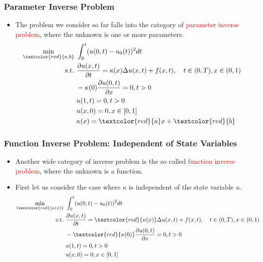 \documentclass{beamer}
\begin{document}
\begin{frame}
	\frametitle{Parameter Inverse Problem}
	\begin{itemize}
		\item The problem we consider so far falls into the category of \textcolor{red}{parameter inverse problem}, where the unknown is one or more parameters. 
		$$\begin{aligned}
\min_{\textcolor{red}{a, b}}\ & \int_{0}^t ( u(0, t)- u_0(t))^2 dt\\
\mathrm{s.t.}\ & \frac{\partial u(x, t)}{\partial t} = \kappa(x)\Delta u(x, t) + f(x, t), \quad t\in (0,T), x\in (0,1) \\
& -\kappa(0)\frac{\partial u(0,t)}{\partial x} = 0, t>0\\
& u(1, t) = 0, t>0\\
& u(x, 0) = 0, x\in [0,1]\\
& \kappa(x) = \textcolor{red}{a} x + \textcolor{red}{b}
\end{aligned}$$

	\end{itemize}
\end{frame}

\begin{frame}
	\frametitle{Function Inverse Problem: Independent of State Variables}
	\begin{itemize}
		\item Another wide category of inverse problem is the so called \textcolor{red}{function inverse problem}, where the unknown is a function. 
		\item First let us consider the case where $\kappa$ is independent of the state variable $u$. 
		$$\begin{aligned}
\min_{\textcolor{red}{\kappa(x)}}\ & \int_{0}^t ( u(0, t)- u_0(t))^2 dt\\
\mathrm{s.t.}\ & \frac{\partial u(x, t)}{\partial t} = \textcolor{red}{\kappa(x)}\Delta u(x, t) + f(x, t), \quad t\in (0,T), x\in (0,1) \\
& -\textcolor{red}{\kappa(0)}\frac{\partial u(0,t)}{\partial x} = 0, t>0\\
& u(1, t) = 0, t>0\\
& u(x, 0) = 0, x\in [0,1]
\end{aligned}$$

	\end{itemize}
\end{frame}
\end{document}
